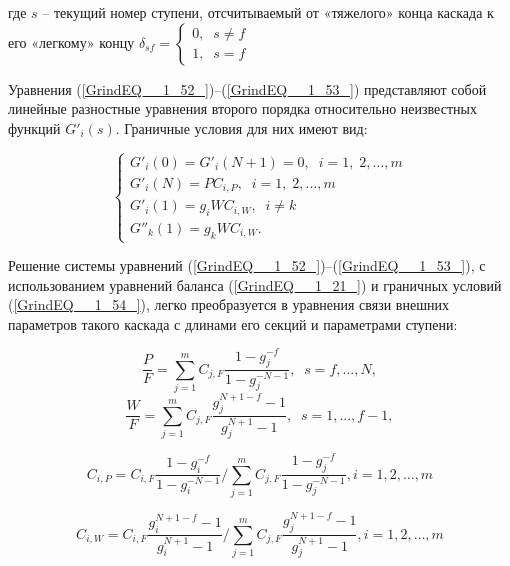 где $s$ – текущий номер ступени, отсчитываемый от «тяжелого» конца каскада к его «легкому» концу $\delta _{sf} =\left\{\begin{array}{l} {0,\; \; s\ne f} \\ {1,\; \; s=f} \end{array}\right. $

Уравнения (\ref{GrindEQ__1_52_})--(\ref{GrindEQ__1_53_}) представляют собой линейные разностные уравнения второго порядка относительно неизвестных функций $G'_{i} (s)$. Граничные условия для них имеют вид:

\begin{equation} \label{GrindEQ__1_54_} 
  \left\{\begin{array}{l} {G'_{i} (0)=G'_{i} (N+1)=0,\; \; i=1,\; 2,...,m} \\ {G'_{i} (N)=PC_{i,P} ,\; \; i=1,\; 2,...,m} \\ {G'_{i} (1)=g_{i} WC_{i,W} ,\; \; i\ne k} \\ {G''_{k} (1)=g_{k} WC_{i,W} .} \end{array}\right.  
\end{equation} 

Решение системы уравнений (\ref{GrindEQ__1_52_})--(\ref{GrindEQ__1_53_}), с использованием уравнений баланса (\ref{GrindEQ__1_21_}) и граничных условий (\ref{GrindEQ__1_54_}), легко преобразуется в уравнения связи внешних параметров такого каскада с длинами его секций и параметрами ступени:

\begin{equation} \label{GrindEQ__1_55_} 
  \frac{P}{F} =\sum _{j=1}^{m}C_{j,F} \frac{1-g_{j}^{-f} }{1-g_{j}^{-N-1}} ,\; \; s=f,...,N ,                                                  
  \end{equation} 
  \begin{equation} \label{GrindEQ__1_56_} 
  \frac{W}{F} =\sum _{j=1}^{m}C_{j,F} \frac{g_{j}^{N+1-f} -1}{g_{j}^{N+1} -1} ,\; \; s=1,...,f-1 ,                                            
\end{equation}

\begin{equation} \label{GrindEQ__1_57_} 
  C_{i,P}=C_{i,F} \frac{1-g_{i}^{-f}}{1-g_{i}^{-N-1}} / \sum_{j=1}^{m} C_{j,F} \frac{1-g_{j}^{-f}}{1-g_{j}^{-N-1}}, i=1,2, \ldots, m                             
\end{equation}

\begin{equation} \label{GrindEQ__1_58_} 
  C_{i,W}=C_{i,F} \frac{g_{i}^{N+1-f}-1}{g_{i}^{N+1}-1} / \sum_{j=1}^{m} C_{j,F} \frac{g_{j}^{N+1-f}-1}{g_{j}^{N+1}-1}, i=1,2, \ldots, m                         
\end{equation} 

